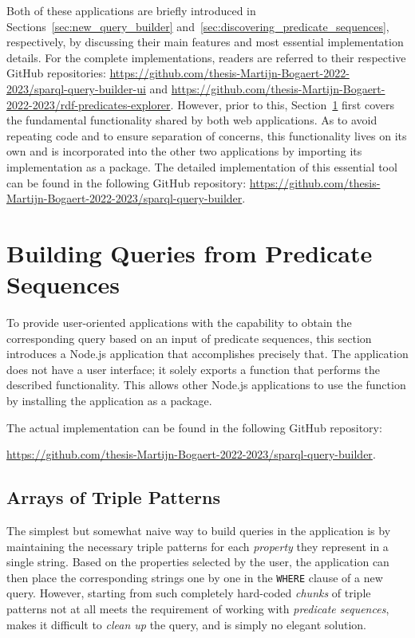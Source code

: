 Both of these applications are briefly introduced in Sections~\ref{sec:new_query_builder} and~\ref{sec:discovering_predicate_sequences}, respectively, by discussing their main features and most essential implementation details. For the complete implementations, readers are referred to their respective GitHub repositories: \url{https://github.com/thesis-Martijn-Bogaert-2022-2023/sparql-query-builder-ui} and \url{https://github.com/thesis-Martijn-Bogaert-2022-2023/rdf-predicates-explorer}. However, prior to this, Section~\ref{sec:building_queries_predicate_sequences} first covers the fundamental functionality shared by both web applications. As to avoid repeating code and to ensure separation of concerns, this functionality lives on its own and is incorporated into the other two applications by importing its implementation as a package. The detailed implementation of this essential tool can be found in the following GitHub repository: \url{https://github.com/thesis-Martijn-Bogaert-2022-2023/sparql-query-builder}.

\section{Building Queries from Predicate Sequences}
\label{sec:building_queries_predicate_sequences}

To provide user-oriented applications with the capability to obtain the corresponding query based on an input of predicate sequences, this section introduces a Node.js application that accomplishes precisely that. The application does not have a user interface; it solely exports a function that performs the described functionality. This allows other Node.js applications to use the function by installing the application as a package.

The actual implementation can be found in the following GitHub repository:
\begin{center}
    \url{https://github.com/thesis-Martijn-Bogaert-2022-2023/sparql-query-builder}.
\end{center}

\subsection{Arrays of Triple Patterns}

The simplest but somewhat naive way to build queries in the application is by maintaining the necessary triple patterns for each \textit{property} they represent in a single string. Based on the properties selected by the user, the application can then place the corresponding strings one by one in the \texttt{WHERE} clause of a new query. However, starting from such completely hard-coded \textit{chunks} of triple patterns not at all meets the requirement of working with \textit{predicate sequences}, makes it difficult to \textit{clean up} the query, and is simply no elegant solution.

